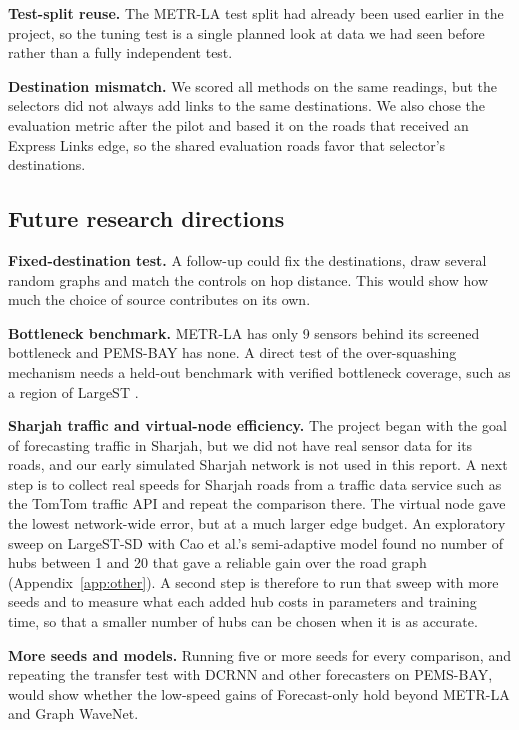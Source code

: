 \documentclass[journal]{IEEEtran}
\begin{document}
\textbf{Test-split reuse.} The METR-LA test split had already been used earlier in the project, so the tuning test is a single planned look at data we had seen before rather than a fully independent test.

\textbf{Destination mismatch.} We scored all methods on the same readings, but the selectors did not always add links to the same destinations. We also chose the evaluation metric after the pilot and based it on the roads that received an Express Links edge, so the shared evaluation roads favor that selector's destinations.

\subsection{Future research directions}
\textbf{Fixed-destination test.} A follow-up could fix the destinations, draw several random graphs and match the controls on hop distance. This would show how much the choice of source contributes on its own.

\textbf{Bottleneck benchmark.} METR-LA has only 9 sensors behind its screened bottleneck and PEMS-BAY has none. A direct test of the over-squashing mechanism needs a held-out benchmark with verified bottleneck coverage, such as a region of LargeST \cite{liu2023largest}.

\textbf{Sharjah traffic and virtual-node efficiency.} The project began with the goal of forecasting traffic in Sharjah, but we did not have real sensor data for its roads, and our early simulated Sharjah network is not used in this report. A next step is to collect real speeds for Sharjah roads from a traffic data service such as the TomTom traffic API and repeat the comparison there. The virtual node gave the lowest network-wide error, but at a much larger edge budget. An exploratory sweep on LargeST-SD with Cao et al.'s semi-adaptive model \cite{cao2025virtual} found no number of hubs between 1 and 20 that gave a reliable gain over the road graph (Appendix~\ref{app:other}). A second step is therefore to run that sweep with more seeds and to measure what each added hub costs in parameters and training time, so that a smaller number of hubs can be chosen when it is as accurate.

\textbf{More seeds and models.} Running five or more seeds for every comparison, and repeating the transfer test with DCRNN and other forecasters on PEMS-BAY, would show whether the low-speed gains of Forecast-only hold beyond METR-LA and Graph WaveNet.
\end{document}
